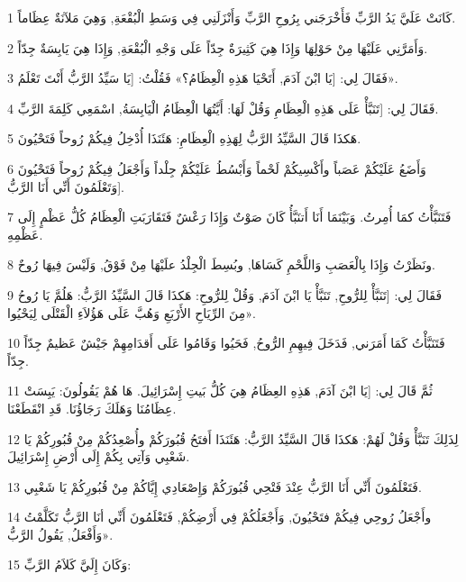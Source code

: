 \par 1 كَانَتْ عَلَيَّ يَدُ الرَّبِّ فَأَخْرَجَني بِرُوحِ الرَّبِّ وَأَنْزَلَنِي فِي وَسَطِ الْبُقْعَةِ, وَهِيَ مَلآنَةٌ عِظَاماً.
\par 2 وَأَمَرَّنِي عَلَيْهَا مِنْ حَوْلِهَا وَإِذَا هِيَ كَثِيرَةٌ جِدّاً عَلَى وَجْهِ الْبُقْعَةِ, وَإِذَا هِيَ يَابِسَةٌ جِدّاً.
\par 3 فَقَالَ لِي: [يَا ابْنَ آدَمَ, أَتَحْيَا هَذِهِ الْعِظَامُ؟» فَقُلْتُ: [يَا سَيِّدُ الرَّبُّ أَنْتَ تَعْلَمُ».
\par 4 فَقَالَ لِي: [تَنَبَّأْ عَلَى هَذِهِ الْعِظَامِ وَقُلْ لَهَا: أَيَّتُهَا الْعِظَامُ الْيَابِسَةُ, اسْمَعِي كَلِمَةَ الرَّبِّ.
\par 5 هَكذَا قَالَ السَّيِّدُ الرَّبُّ لِهَذِهِ الْعِظَامِ: هَئَنَذَا أُدْخِلُ فِيكُمْ رُوحاً فَتَحْيُونَ.
\par 6 وَأَضَعُ عَلَيْكُمْ عَصَباً وأَكْسِيكُمْ لَحْماً وَأَبْسُطُ عَلَيْكُمْ جِلْداً وَأَجْعَلُ فِيكُمْ رُوحاً فَتَحْيُونَ وَتَعْلَمُونَ أَنِّي أَنَا الرَّبُّ].
\par 7 فَتَنَبَّأْتُ كمَا أُمِرتُ. وَبَيْنَمَا أَنَا أَتنَبَّأُ كَانَ صَوْتٌ وَإِذَا رَعْشٌ فَتَقَارَبَتِ الْعِظَامُ كُلُّ عَظْمٍ إِلَى عَظْمِهِ.
\par 8 ونَظَرْتُ وَإِذَا بِالْعَصَبِ وَاللَّحْمِ كَسَاهَا, وبُسِطَ الْجِلْدُ علَيْهَا مِنْ فَوْقُ, وَلَيْسَ فِيهَا رُوحٌ.
\par 9 فَقَالَ لِي: [تَنَبَّأْ لِلرُّوحِ, تَنَبَّأْ يَا ابْنَ آدَمَ, وَقُلْ لِلرُّوحِ: هَكذَا قَالَ السَّيِّدُ الرَّبُّ: هَلُمَّ يَا رُوحُ مِنَ الرِّيَاحِ الأَرْبَعِ وَهُبَّ عَلَى هَؤُلاَءِ الْقَتْلَى لِيَحْيُوا».
\par 10 فَتَنَبَّأْتُ كَمَا أَمَرَني, فَدَخَلَ فِيهِمِ الرُّوحُ, فَحَيُوا وَقَامُوا عَلَى أَقدَامِهِمْ جَيْشٌ عَظيمٌ جِدّاً جِدّاً.
\par 11 ثُمَّ قَالَ لِي: [يَا ابْنَ آدَمَ, هَذِهِ العِظَامُ هِيَ كُلُّ بَيتِ إِسْرَائِيلَ. هَا هُمْ يَقُولُونَ: يَبِسَتْ عِظَامُنَا وَهَلَكَ رَجَاؤُنَا. قَدِ انْقَطَعْنَا.
\par 12 لِذَلِكَ تَنَبَّأْ وَقُلْ لَهُمْ: هَكذَا قَالَ السَّيِّدُ الرَّبُّ: هَئَنَذَا أَفتَحُ قُبُورَكُمْ وأُصْعِدُكُمْ مِنْ قُبُورِكُمْ يَا شَعْبِي وَآتِي بِكُمْ إِلَى أَرْضِ إِسْرَائِيلَ.
\par 13 فَتَعْلَمُونَ أَنِّي أَنَا الرَّبُّ عِنْدَ فَتْحِي قُبُورَكُمْ وَإِصْعَادِي إِيَّاكُمْ مِنْ قُبُورِكُمْ يَا شَعْبِي.
\par 14 وأَجْعَلُ رُوحِي فِيكُمْ فتَحْيُونَ, وَأَجْعَلُكُمْ فِي أَرْضِكُمْ, فَتَعْلَمُونَ أَنِّي أنَا الرَّبُّ تَكَلَّمْتُ وَأَفْعَلُ, يَقُولُ الرَّبُّ».
\par 15 وَكَانَ إِلَيَّ كَلاَمُ الرَّبِّ:
